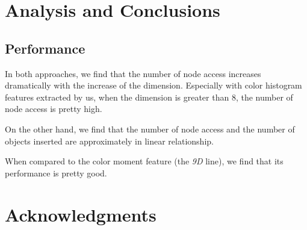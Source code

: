 \documentclass{acm_proc_article-sp}
\begin{document}
\section{Analysis and Conclusions}
\subsection{Performance}
In both approaches, we find that the number of node access increases dramatically with the increase of the dimension. Especially with color histogram features extracted by us, when the dimension is greater than 8, the number of node access is pretty high. 

On the other hand, we find that the number of node access and the number of objects inserted are approximately in linear relationship.

When compared to the color moment feature (the \textit{9D} line), we find that its performance is pretty good.




\section{Acknowledgments}






\end{document}
